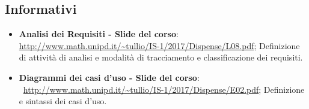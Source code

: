 \documentclass[./AnalisideiRequisiti.tex]{subfiles}
\begin{document}
\subsection*{Informativi}
\begin{itemize}
	\item \textbf{Analisi dei Requisiti - Slide del corso}: \\ \url{http://www.math.unipd.it/~tullio/IS-1/2017/Dispense/L08.pdf};
	\subitem Definizione di attività di analisi e modalità di tracciamento e classificazione dei requisiti. 
	\item \textbf{Diagrammi dei casi d'uso - Slide del corso}: \\\ \url{http://www.math.unipd.it/~tullio/IS-1/2017/Dispense/E02.pdf};
	\subitem Definizione e sintassi dei casi d'uso.
\end{itemize}
\end{document}
